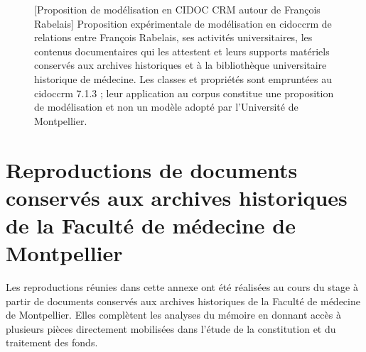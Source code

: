 \begin{landscape}
\begin{figure}[p]
{\begin{minipage}{\linewidth}
				
				[Proposition de modélisation en CIDOC CRM autour de François Rabelais]
				{Proposition expérimentale de modélisation en \gls{cidoccrm} de relations entre François Rabelais, ses activités universitaires, les contenus documentaires qui les attestent et leurs supports matériels conservés aux archives historiques et à la bibliothèque universitaire historique de médecine. Les classes et propriétés sont empruntées au \gls{cidoccrm} 7.1.3 ; leur application au corpus constitue une proposition de modélisation et non un modèle adopté par l'Université de Montpellier.}
				
				\label{fig:rabelais-cidoccrm}
				
			\end{minipage}%
		}
		
	\end{figure}
\end{landscape}

\chapter{Reproductions de documents conservés aux archives historiques de la Faculté de médecine de Montpellier}
\label{annexe:reproductions-ahfm}

Les reproductions réunies dans cette annexe ont été réalisées au cours
du stage à partir de documents conservés aux archives historiques de la
Faculté de médecine de Montpellier. Elles complètent les analyses du
mémoire en donnant accès à plusieurs pièces directement mobilisées dans
l'étude de la constitution et du traitement des fonds.

